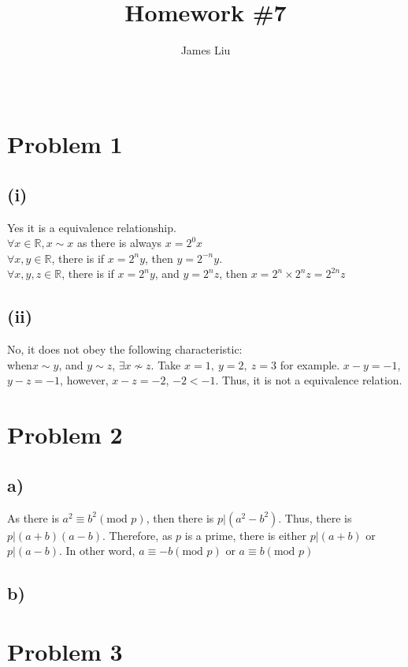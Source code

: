 \documentclass{article}
\title{\textbf{Homework \#7 }}
\author{James Liu}
\date{\ }
\begin{document}
\maketitle
\section*{Problem 1}
\subsection*{(i)}
Yes it is a equivalence relationship.\\
\(\forall x\in\mathbb{R}, x\sim x\) as there is always \(x=2^0x\)\\
\(\forall x,y\in\mathbb{R}\), there is if \(x=2^ny\), then \(y=2^{-n}y\).\\
\(\forall x,y,z\in \mathbb{R}\), there is if \(x=2^ny\), and \(y=2^nz\), then \(x=2^n\times 2^nz=2^{2n}z\)
\subsection*{(ii)}
No, it does not obey the following characteristic:\\
when\(x\sim y\), and  \(y\sim z\), \(\exists x \not\sim z\). Take \(x=1,\ y=2,\ z=3\) for example. \(x-y = -1\), 
\(y-z=-1\), however, \(x-z=-2\), \(-2<-1\). Thus, it is not a equivalence relation.
\section*{Problem 2}
\subsection*{a)}
As there is \(a^2\equiv b^2 (\text{mod }p)\), then there is \(p|(a^2-b^2)\). Thus, there is \(p|(a+b)(a-b)\).
Therefore, as \(p\) is a prime, there is either \(p|(a+b)\) or \(p|(a-b)\). In other word, \(a\equiv -b (\text{mod }p)\) or \(a\equiv b (\text{mod }p)\)
\subsection*{b)}

\section*{Problem 3}
\end{document}

